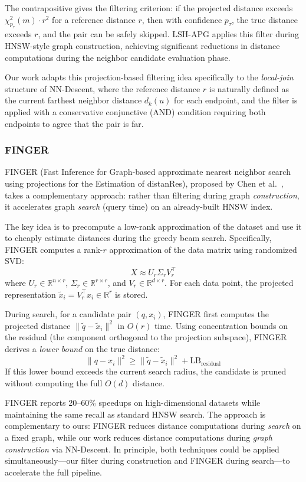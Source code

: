 The contrapositive gives the filtering criterion: if the projected distance exceeds $\chi^2_{p_\tau}(m) \cdot r^2$ for a reference distance $r$, then with confidence $p_\tau$, the true distance exceeds $r$, and the pair can be safely skipped.
LSH-APG applies this filter during HNSW-style graph construction, achieving significant reductions in distance computations during the neighbor candidate evaluation phase.

Our work adapts this projection-based filtering idea specifically to the \emph{local-join} structure of NN-Descent, where the reference distance $r$ is naturally defined as the current farthest neighbor distance $d_k(u)$ for each endpoint, and the filter is applied with a conservative conjunctive (AND) condition requiring both endpoints to agree that the pair is far.

\subsubsection{FINGER}
\label{sec:finger}

FINGER (Fast Inference for Graph-based approximate nearest neighbor search using projections for the Estimation of distanRes), proposed by Chen et al.~\cite{chen2023finger}, takes a complementary approach: rather than filtering during graph \emph{construction}, it accelerates graph \emph{search} (query time) on an already-built HNSW index.

The key idea is to precompute a low-rank approximation of the dataset and use it to cheaply estimate distances during the greedy beam search.
Specifically, FINGER computes a rank-$r$ approximation of the data matrix using randomized SVD:
\begin{equation}
    X \approx U_r \Sigma_r V_r^\top
\end{equation}
where $U_r \in \mathbb{R}^{n \times r}$, $\Sigma_r \in \mathbb{R}^{r \times r}$, and $V_r \in \mathbb{R}^{d \times r}$.
For each data point, the projected representation $\tilde{x}_i = V_r^\top x_i \in \mathbb{R}^r$ is stored.

During search, for a candidate pair $(q, x_i)$, FINGER first computes the projected distance $\|\tilde{q} - \tilde{x}_i\|^2$ in $O(r)$ time.
Using concentration bounds on the residual (the component orthogonal to the projection subspace), FINGER derives a \emph{lower bound} on the true distance:
\begin{equation}
    \|q - x_i\|^2 \geq \|\tilde{q} - \tilde{x}_i\|^2 + \text{LB}_{\text{residual}}
\end{equation}
If this lower bound exceeds the current search radius, the candidate is pruned without computing the full $O(d)$ distance.

FINGER reports 20--60\% speedups on high-dimensional datasets while maintaining the same recall as standard HNSW search.
The approach is complementary to ours: FINGER reduces distance computations during \emph{search} on a fixed graph, while our work reduces distance computations during \emph{graph construction} via NN-Descent.
In principle, both techniques could be applied simultaneously---our filter during construction and FINGER during search---to accelerate the full pipeline.
